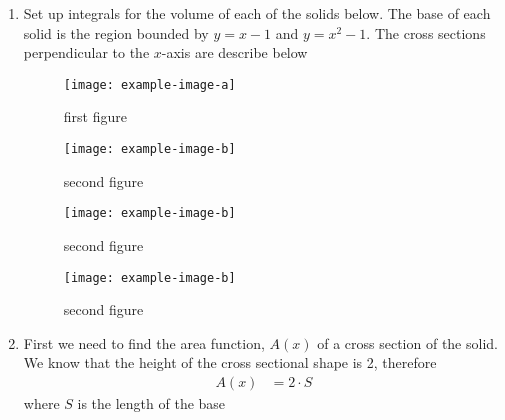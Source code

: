 \documentclass{article}
\begin{document}
\begin{enumerate}[label=\textbf{(8.\arabic*)}]



\item Set up integrals for the volume of each of the solids below. The base of each solid is the region bounded by $y=x-1$ and $y=x^2-1$. The cross sections perpendicular to the $x$-axis are describe below
\begin{figure}
    \centering
    \begin{minipage}{0.45\textwidth}
        \centering
        \texttt{[image: example-image-a]} %
        \caption{first figure}
    \end{minipage}\hfill
    \begin{minipage}{0.45\textwidth}
        \centering
        \texttt{[image: example-image-b]} %
        \caption{second figure}
    \end{minipage}
        \begin{minipage}{0.45\textwidth}
        \centering
        \texttt{[image: example-image-b]} %
        \caption{second figure}
    \end{minipage}\hfill
    \begin{minipage}{0.45\textwidth}
        \centering
        \texttt{[image: example-image-b]} %
        \caption{second figure}
    \end{minipage}
\end{figure}


\item First we need to find the area function, $A(x)$ of a cross section of the solid. We know that the height of the cross sectional shape is 2, therefore
\begin{align*}
A(x) &= 2\cdot S
\end{align*}
where $S$ is the length of the base









\end{enumerate}
\end{document}
